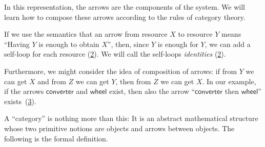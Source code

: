 \begin{figure}[h!]
    \centering
    \caption{\label{fig:e2}}
\end{figure}

In this representation, the arrows are the components of the system.
We will learn how to compose these arrows according to the rules of category theory.

If we use the semantics that an arrow from resource $X$ to resource $Y$ means ``Having $Y$ is
enough to obtain $X$'', then, since $Y$ is enough for $Y$, we can add a self-loop for each
resource (\cref{fig:e3}). We will call the self-loops \emph{identities} (\cref{fig:e3}).

\begin{figure}[h!]
    \centering
    \caption{\label{fig:e3}}
\end{figure}

Furthermore, we might consider the idea of composition of arrows: if from $Y$ we
can get $X$ and from $Z$ we can get $Y$, then from $Z$ we can get $X$. In our
example, if the arrows $\mathsf{converter}$ and $\mathsf{wheel}$ exist, then also the arrow ``$\mathsf{converter}$ then $\mathsf{wheel}$''
exists~(\cref{fig:e4}).


\begin{figure}[h!]
    \centering
    \caption{\label{fig:e4}}
\end{figure}


A ``category'' is nothing more than this: It is an abstract mathematical
structure whose two primitive notions are objects and arrows between objects.
The following is the formal definition.

